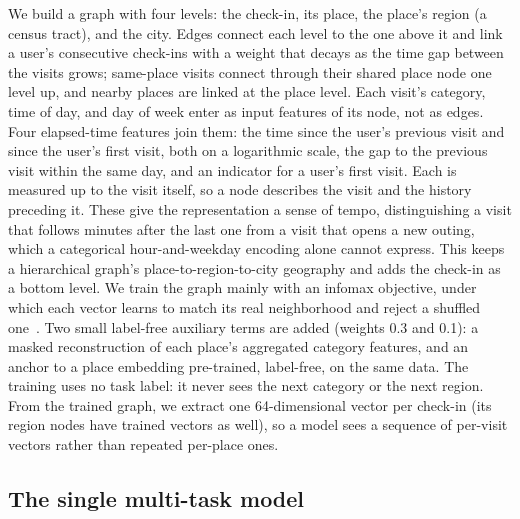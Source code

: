 We build a graph with four levels: the check-in, its place, the place's region (a census tract), and the city. Edges connect each level to the one above it and link a user's consecutive check-ins with a weight that decays as the time gap between the visits grows; same-place visits connect through their shared place node one level up, and nearby places are linked at the place level. Each visit's category, time of day, and day of week enter as input features of its node, not as edges. Four elapsed-time features join them: the time since the user's previous visit and since the user's first visit, both on a logarithmic scale, the gap to the previous visit within the same day, and an indicator for a user's first visit. Each is measured up to the visit itself, so a node describes the visit and the history preceding it. These give the representation a sense of tempo, distinguishing a visit that follows minutes after the last one from a visit that opens a new outing, which a categorical hour-and-weekday encoding alone cannot express. This keeps a hierarchical graph's place-to-region-to-city geography and adds the check-in as a bottom level. We train the graph mainly with an infomax objective, under which each vector learns to match its real neighborhood and reject a shuffled one~\cite{velickovic2019dgi,huang2023hgi}. Two small label-free auxiliary terms are added (weights 0.3 and 0.1): a masked reconstruction of each place's aggregated category
features, and an anchor to a place embedding pre-trained, label-free,
on the same data. The training
uses no task label: it
never sees the next category or the next region. From the trained graph, we extract one 64-dimensional vector per check-in (its region nodes have trained vectors as well), so a model sees a sequence of per-visit vectors rather than repeated per-place ones.

\subsection{The single multi-task model}
\label{sec:method-model}

